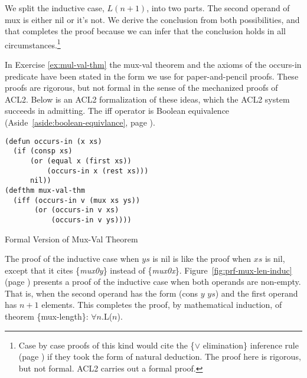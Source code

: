 We split the inductive case, $L(n+1)$, into two parts.
The second operand of \textsf{mux} is either \textsf{nil} or it's not.
We derive the conclusion from both possibilities,
and that completes the proof because we can infer
that the conclusion holds in all
circumstances.\footnote{Case by case proofs of this kind
would cite the \{$\vee$ elimination\} inference rule
(page \pageref{fig-02-deduction-rules}) if they
took the form of natural deduction.
The proof here is rigorous, but not formal.
ACL2 carries out a formal proof.}

\begin{aside}
In Exercise \ref{ex:mul-val-thm} the mux-val theorem
and the axioms of the \textsf{occurs-in} predicate
have been stated in the form we use for paper-and-pencil proofs.
These proofs are rigorous, but not formal
in the sense of the mechanized proofs of ACL2.
Below is an ACL2 formalization of these ideas,
which the ACL2 system succeeds in admitting.
\label{acl2:iff}
The
\textsf{iff}
operator is Boolean equivalence
(Aside~\ref{aside:boolean-equivlance}, page \pageref{aside:boolean-equivlance}).

\label{defun:occurs-in}
\begin{Verbatim}
(defun occurs-in (x xs)
  (if (consp xs)
      (or (equal x (first xs))
          (occurs-in x (rest xs)))
      nil))
(defthm mux-val-thm
  (iff (occurs-in v (mux xs ys))
       (or (occurs-in v xs)
           (occurs-in v ys))))
\end{Verbatim}
\caption{Formal Version of Mux-Val Theorem}
\label{aside:mux-val-thm}\label{defthm:mux-val}
\end{aside}

The proof of the inductive case when $ys$ is \textsf{nil}
is like the proof when $xs$ is \textsf{nil},
except that it cites \{\emph{mux0y}\} instead of \{\emph{mux0x}\}.
Figure~\ref{fig:prf-mux-len-induc} (page \pageref{fig:prf-mux-len-induc})
presents a proof  of the inductive case when both operands are non-empty.
That is, when the second operand has the form \textsf{(cons $y$ $ys$)}
and the first operand has $n+1$ elements.
This completes the proof, by mathematical induction, of
theorem \{mux-length\}: $\forall n.$L($n$).

